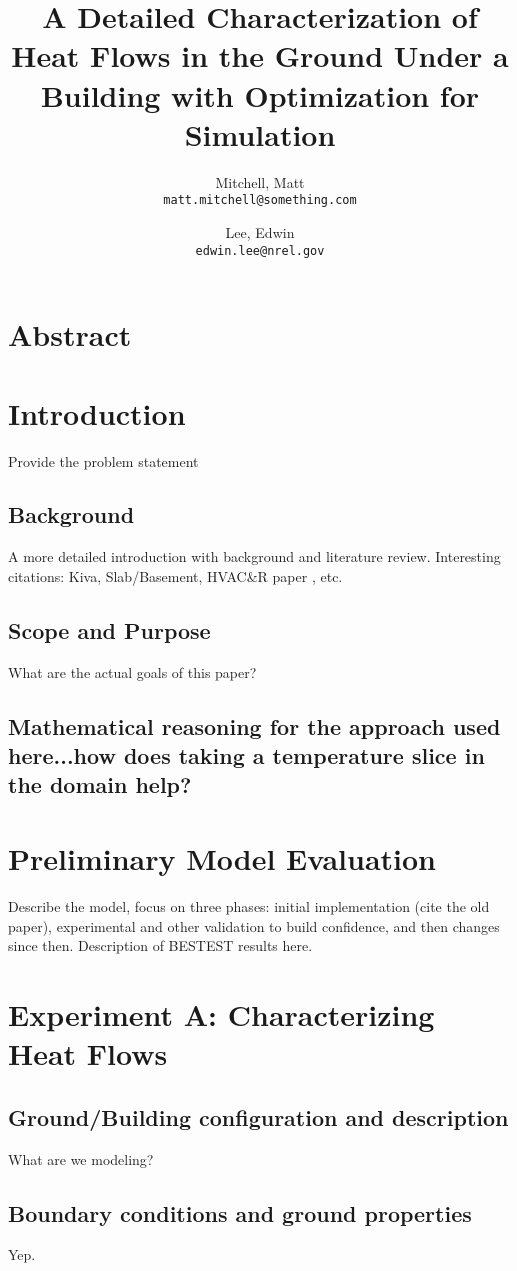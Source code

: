 \documentclass{article}
\title{A Detailed Characterization of Heat Flows in the Ground Under a Building with Optimization for Simulation}
\author{
  Mitchell, Matt\\
  \texttt{matt.mitchell@something.com}
  \and
  Lee, Edwin\\
  \texttt{edwin.lee@nrel.gov}
}
\date{}
\begin{document}
 
 \maketitle
 
 \section*{Abstract}
 
 \section*{Introduction}
     Provide the problem statement
  \subsection*{Background}
     A more detailed introduction with background and literature review.  Interesting citations: Kiva, Slab/Basement, HVAC\&R paper \citep{Lee2013}, etc.
  \subsection*{Scope and Purpose}
     What are the actual goals of this paper?
  \subsection*{Mathematical reasoning for the approach used here...how does taking a temperature slice in the domain help?}
 
 \section*{Preliminary Model Evaluation} 
  Describe the model, focus on three phases: initial implementation (cite the old paper), experimental and other validation to build confidence, and then changes since then.  Description of BESTEST results here.
 
 \section*{Experiment A: Characterizing Heat Flows}
  \subsection*{Ground/Building configuration and description}
   What are we modeling?
  \subsection*{Boundary conditions and ground properties}
   Yep. 
\end{document}

